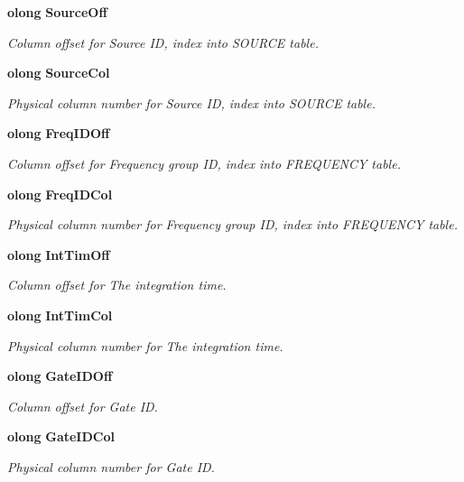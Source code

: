 \begin{CompactItemize}
{\bf olong} {\bf Source\-Off}
\begin{CompactList}\small\item\em Column offset for Source ID, index into SOURCE table. \item\end{CompactList}\item 
{\bf olong} {\bf Source\-Col}
\begin{CompactList}\small\item\em Physical column number for Source ID, index into SOURCE table. \item\end{CompactList}\item 
{\bf olong} {\bf Freq\-IDOff}
\begin{CompactList}\small\item\em Column offset for Frequency group ID, index into FREQUENCY table. \item\end{CompactList}\item 
{\bf olong} {\bf Freq\-IDCol}
\begin{CompactList}\small\item\em Physical column number for Frequency group ID, index into FREQUENCY table. \item\end{CompactList}\item 
{\bf olong} {\bf Int\-Tim\-Off}
\begin{CompactList}\small\item\em Column offset for The integration time. \item\end{CompactList}\item 
{\bf olong} {\bf Int\-Tim\-Col}
\begin{CompactList}\small\item\em Physical column number for The integration time. \item\end{CompactList}\item 
{\bf olong} {\bf Gate\-IDOff}
\begin{CompactList}\small\item\em Column offset for Gate ID. \item\end{CompactList}\item 
{\bf olong} {\bf Gate\-IDCol}
\begin{CompactList}\small\item\em Physical column number for Gate ID. \item\end{CompactList}\item 

\end{CompactItemize}
